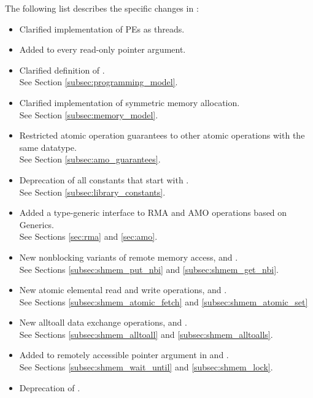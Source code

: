 The following list describes the specific changes in \openshmem[1.3]:
\begin{itemize}
%
\item Clarified implementation of \acp{PE} as threads.
%
\item Added  to every read-only pointer argument.
%
\item Clarified definition of .
\\See Section \ref{subsec:programming_model}.
%
\item Clarified implementation of symmetric memory allocation.
\\See Section \ref{subsec:memory_model}.
%
\item Restricted atomic operation guarantees to other atomic operations with the same datatype.
\\See Section \ref{subsec:amo_guarantees}.
%
\item Deprecation of all constants that start with .
\\See Section \ref{subsec:library_constants}.
%
\item Added a type-generic interface to \openshmem \ac{RMA} and \ac{AMO}
    operations based on \Cstd[11] Generics.
\\See Sections \ref{sec:rma} and \ref{sec:amo}.
%
\item New nonblocking variants of remote memory access, 
    and .
\\See Sections \ref{subsec:shmem_put_nbi} and \ref{subsec:shmem_get_nbi}.
%
\item New atomic elemental read and write operations,  and
    .
\\See Sections \ref{subsec:shmem_atomic_fetch} and \ref{subsec:shmem_atomic_set}
%
\item New alltoall data exchange operations, 
    and .
\\See Sections \ref{subsec:shmem_alltoall} and \ref{subsec:shmem_alltoalls}.
%
\item Added  to remotely accessible pointer argument in
     and .
\\See Sections \ref{subsec:shmem_wait_until} and \ref{subsec:shmem_lock}.
%
\item Deprecation of .
%
\end{itemize}




